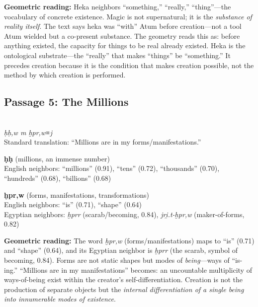 \documentclass[11pt, a4paper]{article}
\newcommand{\passagehiero}[1]{{\normalfont\hierofont\fontsize{14}{17}\selectfont #1}}
\begin{document}
\medskip

{\color{insight}\textbf{Geometric reading:}} Heka neighbors ``something,'' ``really,'' ``thing''---the vocabulary of concrete existence. Magic is not supernatural; it is the \textit{substance of reality itself}. The text says heka was ``with'' Atum before creation---not a tool Atum wielded but a co-present substance. The geometry reads this as: before anything existed, the capacity for things to be real already existed. Heka is the ontological substrate---the ``really'' that makes ``things'' be ``something.'' It precedes creation because it is the condition that makes creation possible, not the method by which creation is performed.

\subsection{Passage 5: The Millions}

{\color{passage}\passagehiero{𓁨𓏥 𓅓 𓆣𓂋𓅱𓏥𓇋}\\\medskip
\textit{\small ḥḥ,w m ḫpr,w≡j}\\
Standard translation: ``Millions are in my forms/manifestations.''}

\bigskip

\noindent\textbf{ḥḥ} (millions, an immense number)\\
English neighbors: ``millions'' (0.91), ``tens'' (0.72), ``thousands'' (0.70), ``hundreds'' (0.68), ``billions'' (0.68)

\medskip

\noindent\textbf{ḫpr,w} (forms, manifestations, transformations)\\
English neighbors: ``is'' (0.71), ``shape'' (0.64)\\
Egyptian neighbors: \textit{ḫprr} (scarab/becoming, 0.84), \textit{jri̯.t-ḫpr,w} (maker-of-forms, 0.82)

\medskip

{\color{insight}\textbf{Geometric reading:}} The word \textit{ḫpr,w} (forms/manifestations) maps to ``is'' (0.71) and ``shape'' (0.64), and its Egyptian neighbor is \textit{ḫprr} (the scarab, symbol of becoming, 0.84). Forms are not static shapes but modes of \textit{being}---ways of ``is-ing.'' ``Millions are in my manifestations'' becomes: an uncountable multiplicity of ways-of-being exist within the creator's self-differentiation. Creation is not the production of separate objects but the \textit{internal differentiation of a single being into innumerable modes of existence}.
\end{document}
